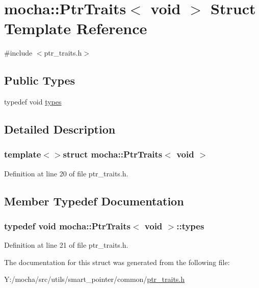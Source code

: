 \hypertarget{structmocha_1_1_ptr_traits_3_01void_01_4}{
\section{mocha::PtrTraits$<$ void $>$ Struct Template Reference}
\label{structmocha_1_1_ptr_traits_3_01void_01_4}
}


{\ttfamily \#include $<$ptr\_\-traits.h$>$}

\subsection*{Public Types}
\begin{DoxyCompactItemize}
\item 
typedef void \hyperlink{structmocha_1_1_ptr_traits_3_01void_01_4_a424c3a5eac94d7c4fa951f19f4106804}{types}
\end{DoxyCompactItemize}


\subsection{Detailed Description}
\subsubsection*{template$<$$>$struct mocha::PtrTraits$<$ void $>$}



Definition at line 20 of file ptr\_\-traits.h.



\subsection{Member Typedef Documentation}
\hypertarget{structmocha_1_1_ptr_traits_3_01void_01_4_a424c3a5eac94d7c4fa951f19f4106804}{
\subsubsection[{types}]{\setlength{\rightskip}{0pt plus 5cm}typedef void {\bf mocha::PtrTraits}$<$ void $>$::{\bf types}}}
\label{structmocha_1_1_ptr_traits_3_01void_01_4_a424c3a5eac94d7c4fa951f19f4106804}


Definition at line 21 of file ptr\_\-traits.h.



The documentation for this struct was generated from the following file:\begin{DoxyCompactItemize}
\item 
Y:/mocha/src/utils/smart\_\-pointer/common/\hyperlink{ptr__traits_8h}{ptr\_\-traits.h}\end{DoxyCompactItemize}
